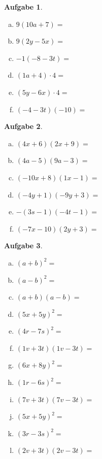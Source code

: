 \documentclass[12pt,fleqn]{article}
\theoremstyle{aufg}
\newtheorem{aufgabe}{Aufgabe}
\theoremstyle{bsp}
\begin{document}
\begin{flushleft}
\begin{aufgabe} ~ \\ 
\begin{multicols}{3} 
\begin{enumerate}[a)] 
\item 
$9(10a+7)=$
\item 
$9(2y-5x)=$
\item 
$-1(-8-3t)=$
\item 
$(1a+4)\cdot 4=$
\item 
$(5y-6x)\cdot 4=$
\item 
$(-4-3t)(-10)=$
\end{enumerate} 
\end{multicols} 
\end{aufgabe} 
\begin{aufgabe} ~ \\ 
\begin{multicols}{3} 
\begin{enumerate}[a)] 
\item 
$(4x+6)(2x+9)=$
\item 
$(4a-5)(9a-3)=$
\item 
$(-10x+8)(1x-1)=$
\item 
$(-4y+1)(-9y+3)=$
\item 
$-(3s-1)(-4t-1)=$
\item 
$(-7x-10)(2y+3)=$
\end{enumerate} 
\end{multicols} 
\end{aufgabe} 
\begin{aufgabe} ~ \\ 
\begin{multicols}{3} 
\begin{enumerate}[a)] 
\item 
$(a+b)^2=$
\item 
$(a-b)^2=$
\item 
$(a+b)(a-b)=$
\item 
$(5x+5y)^2=$
\item 
$(4r-7s)^2=$
\item 
$(1v+3t)(1v-3t)=$
\item 
$(6x+8y)^2=$
\item 
$(1r-6s)^2=$
\item 
$(7v+3t)(7v-3t)=$
\item 
$(5x+5y)^2=$
\item 
$(3r-3s)^2=$
\item 
$(2v+3t)(2v-3t)=$
\end{enumerate} 
\end{multicols} 
\end{aufgabe} 
\end{flushleft} 
\end{document}
